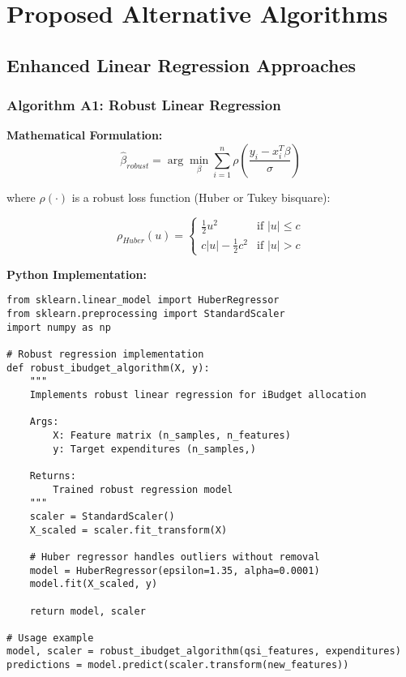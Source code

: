 \documentclass[12pt]{article}
\begin{document}
\section{Proposed Alternative Algorithms}

\subsection{Enhanced Linear Regression Approaches}

\subsubsection{Algorithm A1: Robust Linear Regression}

\textbf{Mathematical Formulation:}
\begin{equation}
\hat{\beta}_{robust} = \arg\min_{\beta} \sum_{i=1}^{n} \rho\left(\frac{y_i - x_i^T\beta}{\sigma}\right)
\end{equation}

where $\rho(\cdot)$ is a robust loss function (Huber or Tukey bisquare):

\begin{equation}
\rho_{Huber}(u) = \begin{cases}
\frac{1}{2}u^2 & \text{if } |u| \leq c \\
c|u| - \frac{1}{2}c^2 & \text{if } |u| > c
\end{cases}
\end{equation}

\textbf{Python Implementation:}
\begin{lstlisting}
from sklearn.linear_model import HuberRegressor
from sklearn.preprocessing import StandardScaler
import numpy as np

# Robust regression implementation
def robust_ibudget_algorithm(X, y):
    """
    Implements robust linear regression for iBudget allocation
    
    Args:
        X: Feature matrix (n_samples, n_features)
        y: Target expenditures (n_samples,)
    
    Returns:
        Trained robust regression model
    """
    scaler = StandardScaler()
    X_scaled = scaler.fit_transform(X)
    
    # Huber regressor handles outliers without removal
    model = HuberRegressor(epsilon=1.35, alpha=0.0001)
    model.fit(X_scaled, y)
    
    return model, scaler

# Usage example
model, scaler = robust_ibudget_algorithm(qsi_features, expenditures)
predictions = model.predict(scaler.transform(new_features))
\end{lstlisting}
\end{document}
